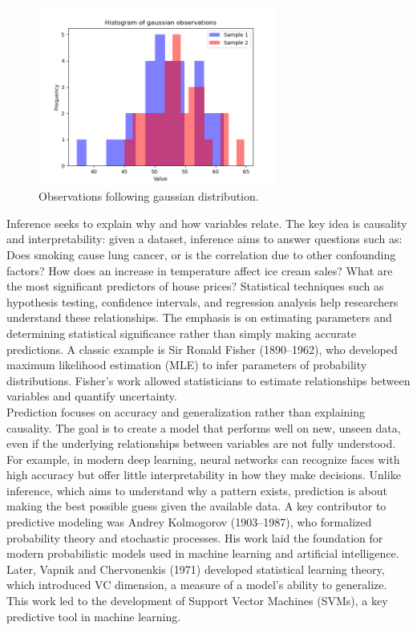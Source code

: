 \documentclass{book}
\begin{document}
\begin{figure}[ht]
    \centering
    \includegraphics[width=0.7\textwidth]{figures/chapter4/t_2_samples_observations.png}
    \caption{Observations following gaussian distribution.}
    \label{fig:t_2_sample_obs}
\end{figure}

Inference seeks to explain why and how variables relate. The key idea is causality and interpretability: given a dataset, inference aims to answer questions such as: Does smoking cause lung cancer, or is the correlation due to other confounding factors? How does an increase in temperature affect ice cream sales? What are the most significant predictors of house prices? Statistical techniques such as hypothesis testing, confidence intervals, and regression analysis help researchers understand these relationships. The emphasis is on estimating parameters and determining statistical significance rather than simply making accurate predictions. A classic example is Sir Ronald Fisher (1890–1962), who developed maximum likelihood estimation (MLE) to infer parameters of probability distributions. Fisher’s work allowed statisticians to estimate relationships between variables and quantify uncertainty.\\

Prediction focuses on accuracy and generalization rather than explaining causality. The goal is to create a model that performs well on new, unseen data, even if the underlying relationships between variables are not fully understood. For example, in modern deep learning, neural networks can recognize faces with high accuracy but offer little interpretability in how they make decisions. Unlike inference, which aims to understand why a pattern exists, prediction is about making the best possible guess given the available data. A key contributor to predictive modeling was Andrey Kolmogorov (1903–1987), who formalized probability theory and stochastic processes. His work laid the foundation for modern probabilistic models used in machine learning and artificial intelligence. Later, Vapnik and Chervonenkis (1971) developed statistical learning theory, which introduced VC dimension, a measure of a model’s ability to generalize. This work led to the development of Support Vector Machines (SVMs), a key predictive tool in machine learning.\\
\end{document}
